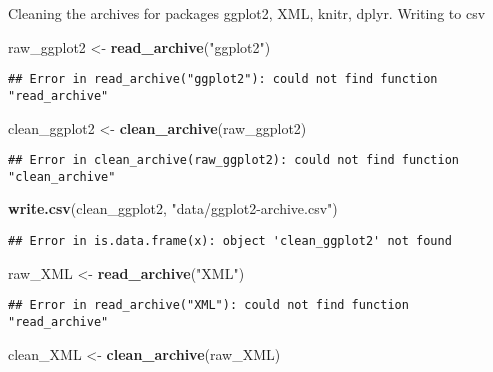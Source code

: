 \documentclass[]{article}
\newenvironment{Shaded}{\begin{snugshade}}{\end{snugshade}}
\newcommand{\KeywordTok}[1]{\textcolor[rgb]{0.13,0.29,0.53}{\textbf{#1}}}
\newcommand{\StringTok}[1]{\textcolor[rgb]{0.31,0.60,0.02}{#1}}
\newcommand{\NormalTok}[1]{#1}
\begin{document}
Cleaning the archives for packages ggplot2, XML, knitr, dplyr. Writing
to csv

\begin{Shaded}
\begin{Highlighting}[]
\NormalTok{raw_ggplot2 <-}\StringTok{ }\KeywordTok{read_archive}\NormalTok{(}\StringTok{"ggplot2"}\NormalTok{)}
\end{Highlighting}
\end{Shaded}

\begin{verbatim}
## Error in read_archive("ggplot2"): could not find function "read_archive"
\end{verbatim}

\begin{Shaded}
\begin{Highlighting}[]
\NormalTok{clean_ggplot2 <-}\StringTok{ }\KeywordTok{clean_archive}\NormalTok{(raw_ggplot2)}
\end{Highlighting}
\end{Shaded}

\begin{verbatim}
## Error in clean_archive(raw_ggplot2): could not find function "clean_archive"
\end{verbatim}

\begin{Shaded}
\begin{Highlighting}[]
\KeywordTok{write.csv}\NormalTok{(clean_ggplot2, }\StringTok{"data/ggplot2-archive.csv"}\NormalTok{)}
\end{Highlighting}
\end{Shaded}

\begin{verbatim}
## Error in is.data.frame(x): object 'clean_ggplot2' not found
\end{verbatim}

\begin{Shaded}
\begin{Highlighting}[]
\NormalTok{raw_XML <-}\StringTok{ }\KeywordTok{read_archive}\NormalTok{(}\StringTok{"XML"}\NormalTok{)}
\end{Highlighting}
\end{Shaded}

\begin{verbatim}
## Error in read_archive("XML"): could not find function "read_archive"
\end{verbatim}

\begin{Shaded}
\begin{Highlighting}[]
\NormalTok{clean_XML <-}\StringTok{ }\KeywordTok{clean_archive}\NormalTok{(raw_XML)}
\end{Highlighting}
\end{Shaded}
\end{document}
